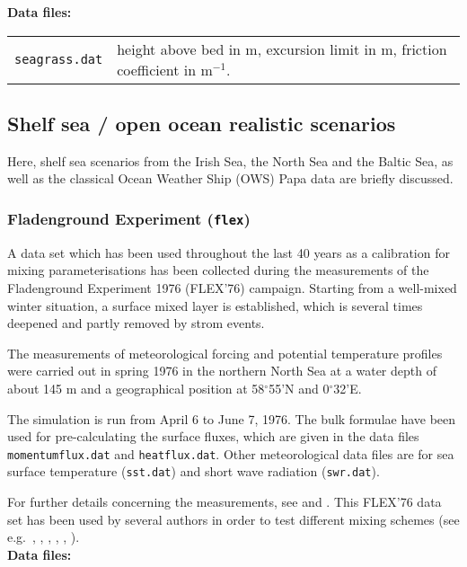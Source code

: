 {\bf Data files:}

\begin{tabular}{ll}
{\tt seagrass.dat}&  height above bed in m, excursion limit in m,
friction coefficient in m$^{-1}$.
\end{tabular}


\subsection{Shelf sea / open ocean realistic scenarios}

Here, shelf sea scenarios 
from the Irish Sea, the
North Sea and the Baltic Sea,
as well as the classical Ocean Weather Ship (OWS) Papa data 
are briefly discussed. 

\subsubsection{Fladenground Experiment ({\tt flex})}\label{flex}

A data set which has been used throughout the last 40 years
as a calibration for mixing parameterisations
has been collected during the
measurements of the Fladenground
Experiment 1976 (FLEX'76) campaign. 
Starting from a well-mixed winter situation, a surface mixed layer is
established, which is several times deepened and partly removed by
strom events.

The measurements
of meteorological forcing and potential temperature profiles
were carried out in spring 1976 in the northern North Sea at a water
depth of about 145 m and a geographical position
at 58$^{\circ}$55'N and 0$^{\circ}$32'E. 

The simulation is run from April 6 to June 7, 1976.
The \cite{Kondo75} bulk formulae have been used for pre-calculating the
surface fluxes, which are given in the data files 
{\tt momentumflux.dat} and {\tt heatflux.dat}.
Other meteorological data files are for sea surface temperature ({\tt sst.dat}) 
and short wave radiation ({\tt swr.dat}).

For further details concerning the measurements,
see \cite{Soetjeetal80} and \cite{Brockmannetal85}.
This FLEX'76 data set has been used by several authors in order to
test different mixing schemes (see e.g.\ \cite{Friedrich83},
\cite{Frey91}, \cite{BurchardBaumert95}, \cite{Pohlmann97},
\cite{BurchardPetersen99}, \cite{Mellor2001}).
\\

{\bf Data files:}


